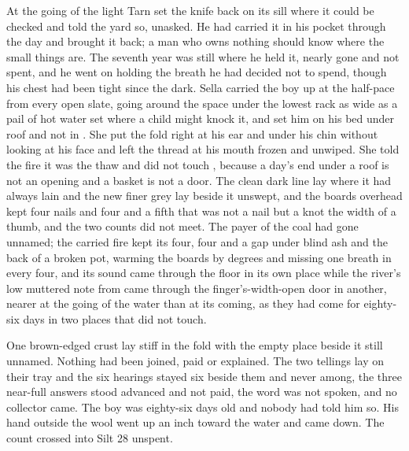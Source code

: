 At the going of the light Tarn set the knife back on its sill where it could be checked and told the yard so, unasked. He had carried it in his pocket through the day and brought it back; a man who owns nothing should know where the small things are. The seventh year was still where he held it, nearly gone and not spent, and he went on holding the breath he had decided not to spend, though his chest had been tight since the dark. Sella carried the boy up at the half-pace from every open slate, going around the space under the lowest rack as wide as a pail of hot water set where a child might knock it, and set him on his bed under  roof and not in . She put the fold right at his ear and under his chin without looking at his face and left the thread at his mouth frozen and unwiped. She told the fire it was the thaw and did not touch , because a day’s end under a roof is not an opening and a basket is not a door. The clean dark line lay where it had always lain and the new finer grey lay beside it unswept, and the boards overhead kept four nails and four and a fifth that was not a nail but a knot the width of a thumb, and the two counts did not meet. The payer of the coal had gone unnamed; the carried fire kept its four, four and a gap under blind ash and the back of a broken pot, warming the boards by degrees and missing one breath in every four, and its sound came through the floor in its own place while the river’s low muttered note from  came through the finger’s-width-open door in another, nearer at the going of the water than at its coming, as they had come for eighty-six days in two places that did not touch.

One brown-edged crust lay stiff in the fold with the empty place beside it still unnamed. Nothing had been joined, paid or explained. The two tellings lay on their tray and the six hearings stayed six beside them and never among, the three near-full answers stood advanced and not paid, the word was not spoken, and no collector came. The boy was eighty-six days old and nobody had told him so. His hand outside the wool went up an inch toward the water and came down. The count crossed into Silt 28 unspent.

